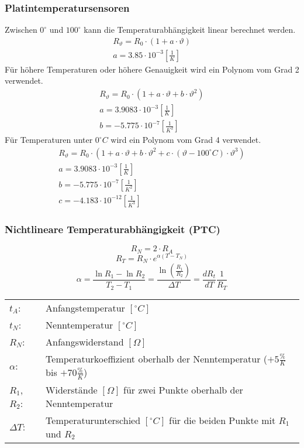 \subsubsection{Platintemperatursensoren}
Zwischen $0^\circ$ und $100^\circ$ kann die Temperaturabhängigkeit linear 
berechnet werden. 
\[ \begin{array}{l}
R_\vartheta = R_0 \cdot (1 + a \cdot \vartheta) \\
a = 3.85 \cdot 10^{-3} \left[\frac{1}{K}\right] 
\end{array} \]
%
Für höhere Temperaturen oder höhere Genauigkeit wird ein Polynom vom Grad 2 
verwendet. 
\[ \begin{array}{l}
R_\vartheta = R_0 \cdot (1 + a \cdot \vartheta + b \cdot \vartheta^2) \\
a = 3.9083 \cdot 10^{-3} \left[\frac{1}{K}\right] \\
b = -5.775 \cdot 10^{-7} \left[\frac{1}{K^2}\right] 
\end{array} \]
%
Für Temperaturen unter $0^\circ C$ wird ein Polynom vom Grad 4 verwendet. 
\[ \begin{array}{l}
R_\vartheta = R_0 \cdot (1 + a \cdot \vartheta + b \cdot \vartheta^2 
+ c \cdot (\vartheta - 100^\circ C) \cdot \vartheta^3) \\
a = 3.9083 \cdot 10^{-3} \left[\frac{1}{K}\right] \\
b = -5.775 \cdot 10^{-7} \left[\frac{1}{K^2}\right] \\
c = -4.183 \cdot 10^{-12} \left[\frac{1}{K^3}\right] 
\end{array} \]


\subsubsection{Nichtlineare Temperaturabhängigkeit (PTC)}
\[ R_N = 2 \cdot R_A \]
\[ R_T = R_N \cdot e^{\alpha (T - T_N)} \]
\[ \alpha = \frac{\ln R_1 - \ln R_2}{T_2 - T_1} 
= \frac{\ln\left(\frac{R_1}{R_2}\right)}{\Delta T} 
= \frac{d R_t}{d T}\frac{1}{R_T} \]
\begin{tabular}{@{}lp{}}
  $t_A$:        & Anfangstemperatur $[^\circ C]$ \\
  $t_N$:        & Nenntemperatur $[^\circ C]$ \\
  $R_N$:        & Anfangswiderstand $[\Omega]$ \\
  $\alpha$:     & Temperaturkoeffizient oberhalb der Nenntemperatur 
                  ($+5\frac{\%}{K}$ bis $+70\frac{\%}{K}$) \\
  $R_1$, $R_2$: & Widerstände $[\Omega]$ für zwei Punkte oberhalb der 
                  Nenntemperatur \\
  $\Delta T$:   & Temperaturunterschied $[^\circ C]$ für die beiden Punkte mit 
                  $R_1$ und $R_2$
\end{tabular}

